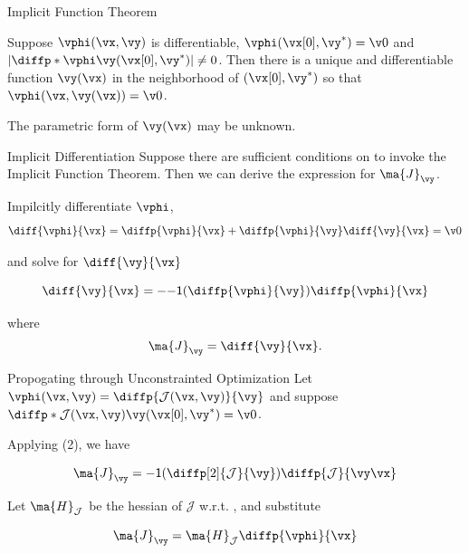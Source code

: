 \documentclass[8pt,aspectratio=169]{beamer}
\begin{document}
\begin{frame}[fragile]{Implicit Function Theorem}
  \begin{theorem}
    Suppose $\vphi(\vx,\vy)$ is differentiable,
    $\vphi(\vx[0],\vy^{*})=\v0$ and $\left|
    \diffp*{\vphi}{\vy}{(\vx[0],\vy^{*})} \right| \neq 0$. Then there
    is a unique and differentiable function $\vy(\vx)$ in the
    neighborhood of $(\vx[0],\vy^{*})$ so that
    $\vphi(\vx,\vy(\vx))=\v0$.
  \end{theorem}
  \vspace{1em}
  The parametric form of $\vy(\vx)$ may be unknown.
\end{frame}


\begin{frame}[fragile]{Implicit Differentiation}
  Suppose there are sufficient conditions on \vphi \xspace to invoke the
  Implicit Function Theorem. Then we can derive the expression for
  $\ma{J}_{\vy}$.

  \vspace{1em}
  Impilcitly differentiate $\vphi$,
  \[
  \diff{\vphi}{\vx} = \diffp{\vphi}{\vx}+\diffp{\vphi}{\vy}\diff{\vy}{\vx} = \v0
  \]

  and solve for   $\diff{\vy}{\vx}$

  \[
  \diff{\vy}{\vx} = -\inv{\left( \diffp{\vphi}{\vy} \right)} \diffp{\vphi}{\vx}
  \]

  where 
  \begin{equation}
    \ma{J}_{\vy} = \diff{\vy}{\vx}.
  \end{equation}
\end{frame}

\begin{frame}[fragile]{Propogating through Unconstrainted Optimization}
  Let $\vphi(\vx,\vy) = \diffp{\mathcal{J}(\vx,\vy)}{\vy}$ and suppose
  $\diffp*{\mathcal{J}(\vx,\vy)}{\vy}{(\vx[0],\vy^{*})} =
  \v0$.

  \vspace{1em}

  Applying (2), we have

  \begin{equation}
    \ma{J}_{\vy} = \inv{\left(\diffp[2]{\mathcal{J}}{\vy}\right)}\diffp{\mathcal{J}}{\vy\vx}
  \end{equation}

  Let $\ma{H}_{\mathcal{J}}$ be the hessian of $\mathcal{J}$ w.r.t. \vy, and substitute

  \begin{equation}
    \ma{J}_{\vy} = \ma{H}_{\mathcal{J}} \diffp{\vphi}{\vx}
  \end{equation}
  
\end{frame}
\end{document}
